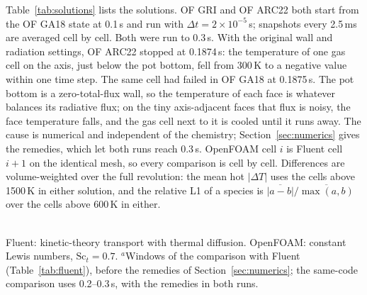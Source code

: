 \documentclass[preprint,review,12pt]{elsarticle}
\begin{document}
Table~\ref{tab:solutions} lists the solutions. OF GRI and OF ARC22 both start from the OF GA18 state at 0.1\,s and run
with $\Delta t=2\times10^{-5}$\,s; snapshots every 2.5\,ms are averaged cell by cell. Both were run to 0.3\,s. With the
original wall and radiation settings, OF ARC22 stopped at 0.1874\,s: the temperature of one gas cell on the axis, just
below the pot bottom, fell from 300\,K to a negative value within one time step. The same cell had failed in OF GA18 at
0.1875\,s. The pot bottom is a zero-total-flux wall, so the temperature of each face is whatever balances its radiative
flux; on the tiny axis-adjacent faces that flux is noisy, the face temperature falls, and the gas cell next to it is
cooled until it runs away. The cause is numerical and independent of the chemistry; Section~\ref{sec:numerics} gives
the remedies, which let both runs reach 0.3\,s. OpenFOAM cell $i$ is Fluent cell $i+1$
on the identical mesh, so every comparison is cell by cell. Differences are volume-weighted over the full revolution:
the mean hot $|\Delta T|$ uses the cells above 1500\,K in either solution, and the relative L1 of a species is
$\overline{|a-b|}/\overline{\max(a,b)}$ over the cells above 600\,K in either.

\begin{table}[t]
\centering\small
\caption{Burner solutions compared.}
\label{tab:solutions}
\\[2pt]{\footnotesize Fluent: kinetic-theory transport with thermal diffusion. OpenFOAM: constant Lewis numbers,
$\mathrm{Sc}_t=0.7$. $^{a}$Windows of the comparison with Fluent (Table~\ref{tab:fluent}), before the remedies of
Section~\ref{sec:numerics}; the same-code comparison uses 0.2--0.3\,s, with the remedies in both runs.}
\end{table}
\end{document}
